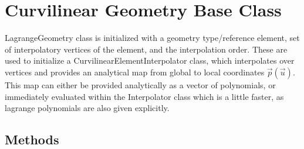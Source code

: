 \section{Curvilinear Geometry Base Class}

LagrangeGeometry class is initialized with a geometry type/reference element, set of interpolatory vertices of the element, and the interpolation order. These are used to initialize a CurvilinearElementInterpolator class, which interpolates over vertices and provides an analytical map from global to local coordinates $\vec{p}(\vec{u})$. This map can either be provided analytically as a vector of polynomials, or immediately evaluated within the Interpolator class which is a little faster, as lagrange polynomials are also given explicitly.

\subsection{Methods}

